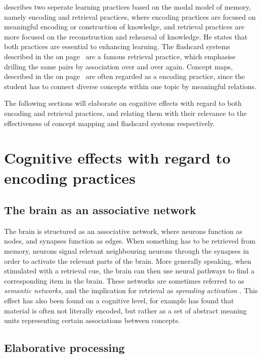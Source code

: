  describes two seperate learning practices based on the modal model of memory, namely encoding and retrieval practices, where encoding practices are focused on meaningful encoding or construction of knowledge, and retrieval practices are more focused on the reconstruction and rehearsal of knowledge. He states that both practices are essential to enhancing learning. The flashcard systems described in the  on page~\pageref{sec:intro_fc} are a famous retrieval practice, which emphasise drilling the same pairs by association over and over again. Concept maps, described in the  on page~\pageref{sec:intro_cmap} are often regarded as a encoding practice, since the student has to connect diverse concepts within one topic by meaningful relations.

The following sections will elaborate on cognitive effects with regard to both encoding and retrieval practices, and relating them with their relevance to the effectiveness of concept mapping and flashcard systems respectively.

\section{Cognitive effects with regard to encoding practices}

\subsection{The brain as an associative network}

The brain is structured as an associative network, where neurons function as nodes, and synapses function as edges. When something has to be retrieved from memory, neurons signal relevant neighbouring neurons through the synapses in order to activate the relevant parts of the brain. More generally speaking, when stimulated with a retrieval cue, the brain can then use neural pathways to find a corresponding item in the brain. These networks are sometimes referred to as \emph{semantic networks}, and the implication for retrieval as \emph{spreading activation} \cite{cognitivepsychology}. This effect has also been found on a cognitive level, for example  has found that material is often not literally encoded, but rather as a set of abstract meaning units representing certain associations between concepts.

\subsection{Elaborative processing}

